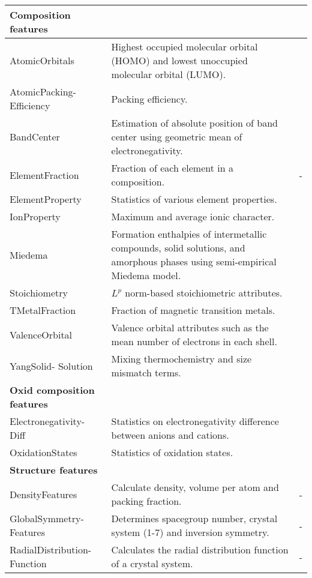 \begin{center}
\begin{longtable}{M{3.5cm} M{6.5cm} M{2.0cm}}
  \hline
  \hline
  \textbf{Composition features} & & \\
  \hline
  AtomicOrbitals & Highest occupied molecular orbital (HOMO) and lowest unoccupied molecular orbital (LUMO). & \cite{Kotochigova1997}  \\ \hline
  AtomicPacking- Efficiency & Packing efficiency. & \cite{Laws2015}  \\ \hline
  BandCenter & Estimation of absolute position of band center using geometric mean of electronegativity. & \cite{Butler1978} \\ \hline
  ElementFraction & Fraction of each element in a composition. & -  \\ \hline
  ElementProperty & Statistics of various element properties. & \cite{Ong2013,Ward2016, Deml2016}  \\ \hline
  IonProperty & Maximum and average ionic character. & \cite{Ward2016} \\ \hline
  Miedema & Formation enthalpies of intermetallic compounds, solid solutions, and amorphous phases using semi-empirical Miedema model. & \cite{Weeber1987} \\ \hline
  Stoichiometry & $L^p$ norm-based stoichiometric attributes. & \cite{Ward2016} \\ \hline
  TMetalFraction & Fraction of magnetic transition metals. & \cite{Deml2016}  \\ \hline
  ValenceOrbital & Valence orbital attributes such as the mean number of electrons in each shell. & \cite{Ward2016}  \\ \hline
  YangSolid- Solution & Mixing thermochemistry and size mismatch terms. & \cite{Yang2012} \\
  \hline
  \textbf{Oxid composition features} &  &  \\
  \hline
  Electronegativity- Diff & Statistics on electronegativity difference between anions and cations. & \cite{Deml2016} \\ \hline
  OxidationStates & Statistics of oxidation states. & \cite{Deml2016}  \\ \hline
  \hline
  \textbf{Structure features} & & \\ \hline
  \hline
  DensityFeatures & Calculate density, volume per atom and packing fraction. & - \\ \hline
  GlobalSymmetry- Features & Determines spacegroup number, crystal system (1-7) and inversion symmetry. & - \\ \hline
  RadialDistribution- Function & Calculates the radial distribution function of a crystal system. & - \\ \hline

\end{longtable}
\end{center}
